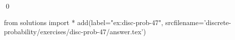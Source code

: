 
\begin{ex} 
  \label{ex:disc-prob-47}
  
  \qed
\end{ex} 
\begin{python0}
from solutions import *
add(label="ex:disc-prob-47",
    srcfilename='discrete-probability/exercises/disc-prob-47/answer.tex') 
\end{python0}

